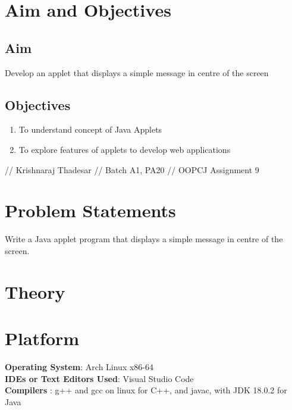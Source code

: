\documentclass[11pt]{article}
\begin{document}
\tableofcontents
\thispagestyle{empty}
\clearpage


\setcounter{page}{1}

\section{Aim and Objectives}
\subsection*{Aim}
Develop an applet that displays a simple message in centre of the screen
\subsection*{Objectives}
\begin{enumerate}
	\item To understand concept of Java Applets
	\item To explore features of applets to develop web applications
\end{enumerate}
// Krishnaraj Thadesar
// Batch A1, PA20
// OOPCJ Assignment 9
\section{Problem Statements}
Write a Java applet program that displays a simple message in centre of the screen.

\section{Theory}

\section{Platform}
\textbf{Operating System}: Arch Linux x86-64 \\
\textbf{IDEs or Text Editors Used}: Visual Studio Code\\
\textbf{Compilers} : g++ and gcc on linux for C++, and javac, with JDK 18.0.2 for Java\\
\end{document}

